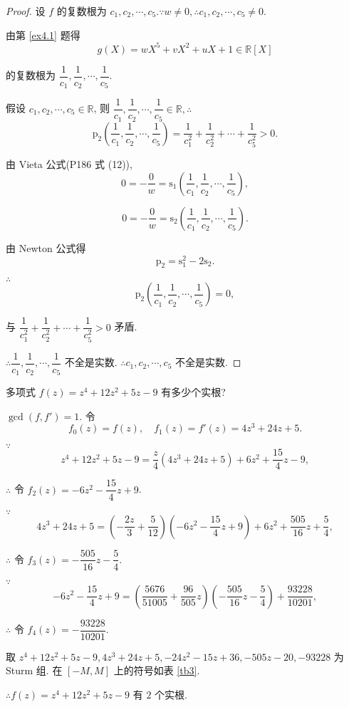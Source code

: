 \documentclass[color=black,device=normal,lang=cn,mode=geye]{elegantnote}
\begin{document}
\begin{proof}
    设 $f$ 的复数根为 $c_1,c_2,\cdots,c_5.\because w\neq0,\therefore c_1,c_2,\cdots,c_5\neq0$.
    
    由第 \ref{ex4.1} 题得
    \[g(X)=wX^5+vX^2+uX+1\in\mathbb{R}[X]\]

    的复数根为 $\dfrac{1}{c_1},\dfrac{1}{c_2},\cdots,\dfrac{1}{c_5}$.

    假设 $c_1,c_2,\cdots,c_5\in\mathbb{R}$, 则 $\dfrac{1}{c_1},\dfrac{1}{c_2},\cdots,\dfrac{1}{c_5}\in\mathbb{R},\therefore$
    \[\mathrm{p}_2\left(\dfrac{1}{c_1},\dfrac{1}{c_2},\cdots,\dfrac{1}{c_5}\right)=\dfrac{1}{c_1^2}+\dfrac{1}{c_2^2}+\cdots+\dfrac{1}{c_5^2}>0.\]    
    
    由 Vieta 公式(P186 式 (12)),
    \[0=-\dfrac{0}{w}=\mathrm{s}_1\left(\dfrac{1}{c_1},\dfrac{1}{c_2},\cdots,\dfrac{1}{c_5}\right),\]

    \[0=-\dfrac{0}{w}=\mathrm{s}_2\left(\dfrac{1}{c_1},\dfrac{1}{c_2},\cdots,\dfrac{1}{c_5}\right).\]

    由 Newton 公式得
    \[\mathrm{p}_2=\mathrm{s}_1^2-2\mathrm{s}_2.\]

    $\therefore$
    \[\mathrm{p}_2\left(\dfrac{1}{c_1},\dfrac{1}{c_2},\cdots,\dfrac{1}{c_5}\right)=0,\]

    与 $\dfrac{1}{c_1^2}+\dfrac{1}{c_2^2}+\cdots+\dfrac{1}{c_5^2}>0$ 矛盾.

    $\therefore\dfrac{1}{c_1},\dfrac{1}{c_2},\cdots,\dfrac{1}{c_5}$ 不全是实数. $\therefore c_1,c_2,\cdots,c_5$ 不全是实数.
\end{proof}
\addtocounter{exercise}{7}
\begin{exercise}%
    多项式 $f(z)=z^4+12z^2+5z-9$ 有多少个实根?
\end{exercise}
\begin{solution}
    $\gcd(f,f')=1$. 令
    \[f_0(z)=f(z),\quad f_1(z)=f'(z)=4z^3+24z+5.\]

    $\because$
    \[z^4+12z^2+5z-9=\dfrac{z}{4}(4z^3+24z+5)+6z^2+\dfrac{15}{4}z-9,\]

    $\therefore$ 令 $f_2(z)=-6z^2-\dfrac{15}{4}z+9$.

    $\because$
    \[4z^3+24z+5=\left(-\dfrac{2z}{3}+\dfrac{5}{12}\right)(-6z^2-\dfrac{15}{4}z+9)+6z^2+\dfrac{505}{16}z+\dfrac{5}{4},\]

    $\therefore$ 令 $f_3(z)=-\dfrac{505}{16}z-\dfrac{5}{4}$.

    $\because$
    \[-6z^2-\dfrac{15}{4}z+9=\left(\dfrac{5676}{51005} + \dfrac{96}{505}z\right)\left(-\dfrac{505}{16}z-\dfrac{5}{4}\right)+\dfrac{93228}{10201},\]

    $\therefore$ 令 $f_4(z)=-\dfrac{93228}{10201}$.

    取 $z^4+12z^2+5z-9,4z^3+24z+5,-24z^2-15z+36,-505z-20,-93228$ 为 Sturm 组. 在 $[-M,M]$ 上的符号如表 \ref{tb3}.

    $\therefore f(z)=z^4+12z^2+5z-9$ 有 $2$ 个实根.
\end{solution}
\end{document}
